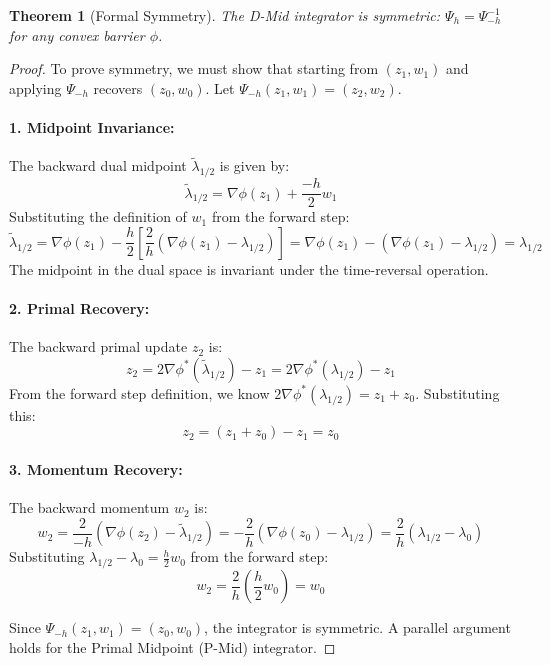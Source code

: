 \documentclass[11pt,a4paper]{article}
\newtheorem{theorem}{Theorem}
\begin{document}
\begin{theorem}[Formal Symmetry]
The D-Mid integrator is symmetric: $\Psi_h = \Psi_{-h}^{-1}$ for any convex barrier $\phi$.
\end{theorem}

\begin{proof}
To prove symmetry, we must show that starting from $(z_1, w_1)$ and applying $\Psi_{-h}$ recovers $(z_0, w_0)$. Let $\Psi_{-h}(z_1, w_1) = (z_2, w_2)$.

\paragraph{1. Midpoint Invariance:}
The backward dual midpoint $\tilde{\lambda}_{1/2}$ is given by:
\begin{equation}
    \tilde{\lambda}_{1/2} = \nabla \phi(z_1) + \frac{-h}{2}w_1
\end{equation}
Substituting the definition of $w_1$ from the forward step:
\begin{equation}
    \tilde{\lambda}_{1/2} = \nabla \phi(z_1) - \frac{h}{2} \left[ \frac{2}{h}(\nabla \phi(z_1) - \lambda_{1/2}) \right] = \nabla \phi(z_1) - (\nabla \phi(z_1) - \lambda_{1/2}) = \lambda_{1/2}
\end{equation}
The midpoint in the dual space is invariant under the time-reversal operation.

\paragraph{2. Primal Recovery:}
The backward primal update $z_2$ is:
\begin{equation}
    z_2 = 2\nabla \phi^*(\tilde{\lambda}_{1/2}) - z_1 = 2\nabla \phi^*(\lambda_{1/2}) - z_1
\end{equation}
From the forward step definition, we know $2\nabla \phi^*(\lambda_{1/2}) = z_1 + z_0$. Substituting this:
\begin{equation}
    z_2 = (z_1 + z_0) - z_1 = z_0
\end{equation}

\paragraph{3. Momentum Recovery:}
The backward momentum $w_2$ is:
\begin{equation}
    w_2 = \frac{2}{-h}(\nabla \phi(z_2) - \tilde{\lambda}_{1/2}) = -\frac{2}{h}(\nabla \phi(z_0) - \lambda_{1/2}) = \frac{2}{h}(\lambda_{1/2} - \lambda_0)
\end{equation}
Substituting $\lambda_{1/2} - \lambda_0 = \frac{h}{2}w_0$ from the forward step:
\begin{equation}
    w_2 = \frac{2}{h} \left( \frac{h}{2}w_0 \right) = w_0
\end{equation}

Since $\Psi_{-h}(z_1, w_1) = (z_0, w_0)$, the integrator is symmetric. A parallel argument holds for the Primal Midpoint (P-Mid) integrator.
\end{proof}
\end{document}
